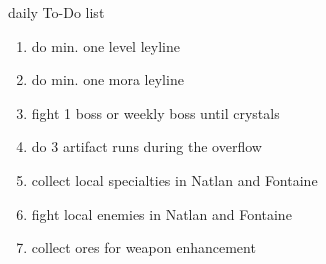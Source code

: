 \documentclass{beamer}
\begin{document}
\begin{frame}{daily To-Do list}
    \begin{enumerate}
        \pause 
        \item do min. one level leyline 
        \pause 
        \item do min. one mora leyline 
        \pause 
        \item fight 1 boss or weekly boss until crystals
        \pause 
        \item do 3 artifact runs during the overflow 
        \pause 
        \item collect local specialties in Natlan and Fontaine 
        \pause 
        \item fight local enemies in Natlan and Fontaine 
        \pause 
        \item collect ores for weapon enhancement 
    \end{enumerate}
\end{frame}
\pause 
\end{document}

